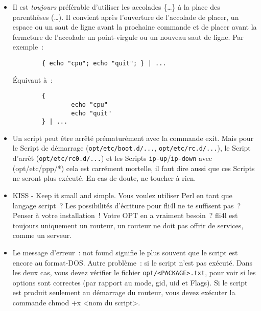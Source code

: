 \begin{itemize}
\item Il est \emph{toujours} préférable d'utiliser les accolades \og{}\{\ldots\}\fg{} à
   la place des parenthèses \og{}(\ldots)\fg{}. Il convient après l’ouverture de l’accolade
   de placer, un espace ou un saut de ligne avant la prochaine commande et de placer avant
   la fermeture de l’accolade un point-virgule ou un nouveau saut de ligne. Par exemple~:

\begin{example}
\begin{verbatim}
        { echo "cpu"; echo "quit"; } | ...
\end{verbatim}
\end{example}

        Équivaut à~:

\begin{example}
\begin{verbatim}
        {
                echo "cpu"
                echo "quit"
        } | ...
\end{verbatim}
\end{example}

      \item Un script peut être arrêté prématurément avec la commande \og{}exit\fg{}.
        Mais pour le Script de démarrage (\texttt{opt/etc/boot.d/...}, \texttt{opt/etc/rc.d/...}),
        le Script d’arrêt (\texttt{opt/etc/rc0.d/...}) et les Scripts \texttt{ip-up}/\texttt{ip-down}
		avec (opt/etc/ppp/*) cela est carrément mortelle, il faut dire aussi
        que ces Scripts ne seront plus exécuté. En cas de doute, ne toucher
        à rien.

      \item KISS - Keep it small and simple. Vous voulez utiliser Perl en tant
        que langage script~? Les possibilités d’écriture pour fli4l ne te
        suffisent pas~? Penser à votre installation~! Votre OPT en a vraiment
        besoin~? fli4l est toujours \og{}uniquement\fg{} un routeur, un routeur
		ne doit pas offrir de services, comme un serveur.

      \item Le message d'erreur~: \og{}not found\fg{} signifie le plus souvent
		que le script est encore au format-DOS. Autre problème~: si le script n'est
		pas exécuté.
        Dans les deux cas, vous devez vérifier le fichier \texttt{opt/<PACKAGE>.txt},
		pour voir si les options sont correctes (par rapport au \og{}mode\fg{}, \og{}gid\fg{},
		\og{}uid\fg{} et Flags). Si le script est produit seulement au démarrage du
		routeur, vous devez exécuter la commande \og{}chmod +x <nom du script>\fg{}.


\end{itemize}
